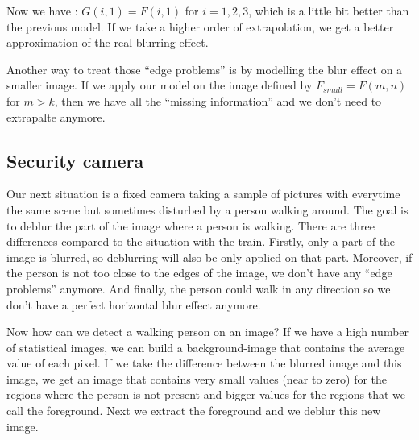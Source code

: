Now we have : $G(i,1) = F(i,1)$ for $i={1,2,3}$, which is a little bit better than the previous model. If we take a higher order of extrapolation, we get a better approximation of the real blurring effect.


Another way to treat those ``edge problems'' is by modelling the blur effect on a smaller image. If we apply our model on the image defined by $F_{small} = F(m,n)$ for $m>k$, then we have all the ``missing information'' and we don't need to extrapalte anymore.


\subsection{Security camera}

Our next situation is a fixed camera taking a sample of pictures with everytime the same scene but sometimes disturbed by a person walking around. The goal is to deblur the part of the image where a person is walking. There are three differences compared to the situation with the train. Firstly, only a part of the image is blurred, so deblurring will also be only applied on that part. Moreover, if the person is not too close to the edges of the image, we don't have any ``edge problems'' anymore. And finally, the person could walk in any direction so we don't have a perfect horizontal blur effect anymore.

Now how can we detect a walking person on an image? If we have a high number of statistical images, we can build a background-image that contains the average value of each pixel. If we take the difference between the blurred image and this image, we get an image that contains very small values (near to zero) for the regions where the person is not present and bigger values for the regions that we call the foreground. Next we extract the foreground and we deblur this new image.
